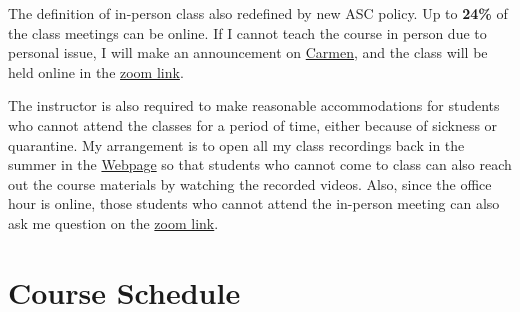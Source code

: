 \documentclass[12pt]{article}
\begin{document}
The definition of in-person class also redefined by new ASC policy.
Up to \textbf{24\%} of the class meetings can be online.
If I cannot teach the course in person due to personal issue, I will make an announcement on \href{https://osu.instructure.com/courses/114824}{Carmen}, and the class will be held online in the \href{https://osu.zoom.us/j/2532324996?pwd=c2cweEphWFMvTVZreHJ0MHNRNUdodz09}{zoom link}.

The instructor is also required to make reasonable accommodations for students who cannot attend the classes for a period of time, either because of sickness or quarantine.
My arrangement is to open all my class recordings back in the summer in the \href{https://huijunchen9260.github.io/PrincipleMacroSpring2022.html}{Webpage} so that students who cannot come to class can also reach out the course materials by watching the recorded videos.
Also, since the office hour is online, those students who cannot attend the in-person meeting can also ask me question on the \href{https://osu.zoom.us/j/2532324996?pwd=c2cweEphWFMvTVZreHJ0MHNRNUdodz09}{zoom link}.


\newpage

\section*{Course Schedule}
\end{document}
